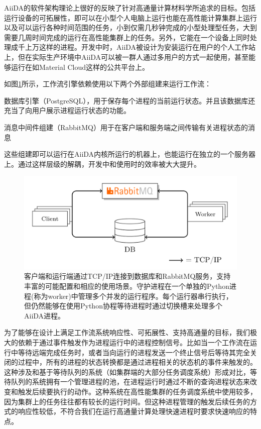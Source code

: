 AiiDA的软件架构理论上很好的反映了针对高通量计算材料学所追求的目标。包括运行设备的可拓展性，即可以在小型个人电脑上运行也能在高性能计算集群上运行以及可以运行各种时间范围的任务，小到仅需几秒钟完成的小型处理型任务，大到需要几周时间完成的运行在高性能集群上的任务。另外，它能在一个设备上同时处理成千上万这样的进程。开发中时，AiiDA被设计为安装运行在用户的个人工作站上，但在实际生产环境中AiiDA可以被一群人通过多用户的方式一起使用，甚至能够运行在如Material Cloud\cite{talirz2020materials}这样的公共平台上。

如图\ref{fig:client-worker}所示，工作流引擎依赖使用以下两个外部组建来运行工作流：
\begin{alphaenum}
    \item 数据库引擎（PostgreSQL\cite{postgresql}），用于保存每个进程的当前运行状态。并且该数据库还充当了向用户展示进程运行状态的功能。
    \item 消息中间件组建（RabbitMQ\cite{rabbitmq}）用于在客户端和服务端之间传输有关进程状态的消息
\end{alphaenum}
这些组建即可以运行在AiiDA内核所运行的机器上，也能运行在独立的一个服务器上。通过这样层级的解耦，开发中和使用时的效率被大大提升。

\begin{figure}
  \includegraphics[width=1.0\textwidth]{figs/db-rmq.png}
  \caption{客户端和运行端通过TCP/IP连接到数据库和RabbitMQ服务，支持丰富的可能配置和相应的使用场景。守护进程在一个单独的Python进程(称为worker)中管理多个并发的运行程序。每个运行器串行执行，但仍然能够在使用Python协程等待进程时通过切换槽来处理多个AiiDA进程。}
  \label{fig:client-worker}
\end{figure}

为了能够在设计上满足工作流系统响应性、可拓展性、支持高通量的目标，我们极大的依赖于通过事件触发作为进程运行中的进程控制信号。比如当一个工作流在运行中等待远端完成任务时，或者当向运行的进程发送一个终止信号后等待其完全关闭的过程中，所有的进程的状态转换都是通过进程相关的状态机的事件来触发的。这种涉及和基于等待队列的系统（如集群端的大部分任务调度系统）形成对比，等待队列的系统拥有一个管理进程的池，在进程运行时通过不断的查询进程状态来改变和触发后续要执行的动作。这种系统在高性能集群的任务调度系统中使用较多，因为集群上的任务往往都有较长的运行时间。但这种进程管理的触发后续任务的方式的响应性较低，不符合我们在运行高通量计算处理快速进程时要求快速响应的特点。

